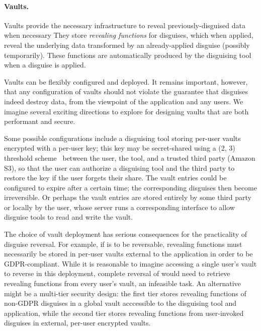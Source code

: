 \paragraph{Vaults.}

Vaults provide the necessary infrastructure to reveal previously-disguised data when
necessary
%
They store \emph{revealing functions} for disguises, which when applied, reveal the underlying
data transformed by an already-applied disguise (possibly temporarily). These functions are
automatically produced by the disguising tool when a disguise is applied.
%

%
Vaults can be flexibly configured and deployed. It remains important, however, that any
configuration of vaults should not violate the guarantee that disguises indeed destroy data,
from the viewpoint of the application and any users.
We imagine several exciting directions to explore for designing vaults that are both
performant and secure.
%

%
Some possible configurations include a disguising tool storing per-user vaults encrypted with a per-user key; this key
may be secret-shared using a (2, 3) threshold scheme~\cite{secretsharing} between the user, the
tool, and a trusted third party (\eg Amazon S3), so that the user can authorize a disguising tool and the
third party to restore the key if the user forgets their share.
%
The vault entries could be configured to expire after a certain time; the corresponding disguises
then become irreversible.
%
Or perhaps the vault entries are stored entirely by some third party or locally by the user, whose
server runs a corresponding interface to allow disguise tools to read and write the vault.

The choice of vault deployment has serious consequences for the practicality of disguise reversal.
For example, if \gdpr is to be reversable, revealing functions must necessarily be stored in per-user
vaults external to the application in order to be GDPR-compliant.  While it is reasonable to imagine
accessing a single user's vault to reverse \gdpr in this deployment, complete reversal of \ca would
need to retrieve revealing functions from every user's vault, an infeasible task.
%
An alternative might be a multi-tier security design: the first tier stores revealing functions of
non-GDPR disguises in a global vault acccessible to the disguising tool and application, while the
second tier stores revealing functions from user-invoked disguises in external, per-user encrypted
vaults.

